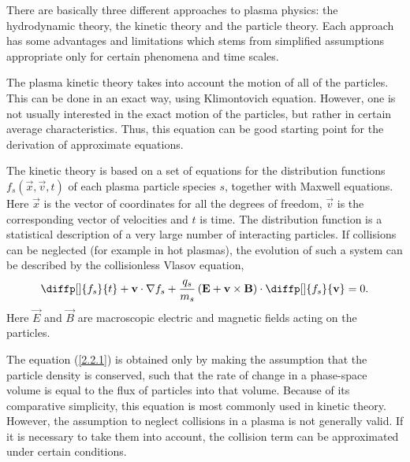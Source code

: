There are basically three different approaches to plasma physics: the hydrodynamic theory, the kinetic theory and the particle theory. Each approach has some advantages and limitations which stems from simplified assumptions appropriate only for certain phenomena and time scales.

The plasma kinetic theory takes into account the motion of all of the particles. This can be done in an exact way, using Klimontovich equation. However, one is not usually interested in the exact motion of the particles, but rather in certain average characteristics. Thus, this equation can be good starting point for the derivation of approximate equations.

The kinetic theory is based on a set of equations for the distribution functions $ f_s \left(\vec{x}, \vec{v}, t \right) $ of each plasma particle species $ s $, together with Maxwell equations. Here $ \vec{x} $ is the vector of coordinates for all the degrees of freedom, $ \vec{v} $ is the corresponding vector of velocities and $ t $ is time. The distribution function is a statistical description of a very large number of interacting particles. If collisions can be neglected (for example in hot plasmas), the evolution of such a system can be described by the collisionless Vlasov equation,
\begin{equation}
\label{2.2.1}
\diffp[]{f_{s}}{t} + \vec{v} \cdot \nabla f_s + \frac{q_{s}}{m_{s}}\left( \vec{E} + \vec{v} \times \vec{B} \right) \cdot \diffp[]{f_s}{\vec{v}} = 0.
\end{equation}
Here $ \vec{E} $ and $ \vec{B} $ are macroscopic electric and magnetic fields acting on the particles.

The equation (\ref{2.2.1}) is obtained only by making the assumption that the particle density is conserved, such that the rate of change in a phase-space volume is equal to the flux of particles into that volume. Because of its comparative simplicity, this equation is most commonly used in kinetic theory. However, the assumption to neglect collisions in a plasma is not generally valid. If it is necessary to take them into account, the collision term can be approximated under certain conditions.

